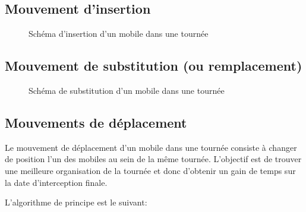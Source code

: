 		\subsection{Mouvement d'insertion}
			\label{subs:move_insert}
			\begin{figure}[h!]
			\centering
			\begin{tikzpicture}[schema]
				
			\end{tikzpicture}
			\caption{Schéma d'insertion d'un mobile dans une tournée}
			\label{fig:move_insert}
			\end{figure}

		\subsection{Mouvement de substitution (ou remplacement)}
			\begin{figure}[h!]
			\centering
			\begin{tikzpicture}[schema]
				
			\end{tikzpicture}
			\caption{Schéma de substitution d'un mobile dans une tournée}
			\label{fig:move_replace}
			\end{figure}

		\subsection{Mouvements de déplacement}
			Le mouvement de déplacement d'un mobile dans une tournée consiste à changer de position l'un des mobiles au sein de la même tournée. L'objectif est de trouver une meilleure organisation de la tournée et donc d'obtenir un gain de temps sur la date d'interception finale.

			L'algorithme de principe est le suivant:
			\begin{code}
				\begin{algo}[informal]
					\BEGIN
									\ENDIF
								\ENDFORGEN
							\ENDFORGEN
						\ENDFORGEN
					\END
				\end{algo}
			\end{code}


